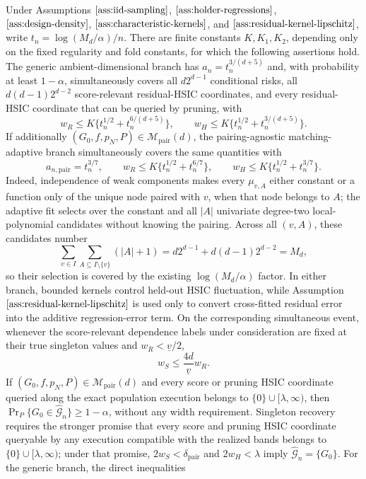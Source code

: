 Under Assumptions \(\ref{ass:iid-sampling}\), \(\ref{ass:holder-regressions}\), \(\ref{ass:design-density}\), \(\ref{ass:characteristic-kernels}\), and \(\ref{ass:residual-kernel-lipschitz}\), write \(t_n=\log(M_d/\alpha)/n\). There are finite constants \(K,K_1,K_2\), depending only on the fixed regularity and fold constants, for which the following assertions hold. The generic ambient-dimensional branch has \(a_n=t_n^{3/(d+5)}\) and, with probability at least \(1-\alpha\), simultaneously covers all \(d2^{d-1}\) conditional risks, all \(d(d-1)2^{d-2}\) score-relevant residual-HSIC coordinates, and every residual-HSIC coordinate that can be queried by pruning, with
\[
 w_R\le K\{t_n^{1/2}+t_n^{6/(d+5)}\},
 \qquad
 w_H\le K\{t_n^{1/2}+t_n^{3/(d+5)}\}.
\]
If additionally \((G_0,f,p_N,P)\in\mathcal M_{\mathrm{pair}}(d)\), the pairing-agnostic matching-adaptive branch simultaneously covers the same quantities with
\[
 a_{n,\mathrm{pair}}=t_n^{3/7},
 \qquad
 w_R\le K\{t_n^{1/2}+t_n^{6/7}\},
 \qquad
 w_H\le K\{t_n^{1/2}+t_n^{3/7}\}.
\]
Indeed, independence of weak components makes every \(\mu_{v,A}\) either constant or a function only of the unique node paired with \(v\), when that node belongs to \(A\); the adaptive fit selects over the constant and all \(|A|\) univariate degree-two local-polynomial candidates without knowing the pairing. Across all \((v,A)\), these candidates number
\[
 \sum_{v\in I}\sum_{A\subseteq I\setminus\{v\}}(|A|+1)
 =d2^{d-1}+d(d-1)2^{d-2}=M_d,
\]
so their selection is covered by the existing \(\log(M_d/\alpha)\) factor. In either branch, bounded kernels control held-out HSIC fluctuation, while Assumption \(\ref{ass:residual-kernel-lipschitz}\) is used only to convert cross-fitted residual error into the additive regression-error term. On the corresponding simultaneous event, whenever the score-relevant dependence labels under consideration are fixed at their true singleton values and \(w_R<\underline v/2\),
\[
 w_S\le \frac{4d}{\underline v}w_R.
\]
If \((G_0,f,p_N,P)\in\mathcal M_{\mathrm{pair}}(d)\) and every score or pruning HSIC coordinate queried along the exact population execution belongs to \(\{0\}\cup[\lambda,\infty)\), then \(\Pr_P\{G_0\in\widehat{\mathcal G}_n\}\ge1-\alpha\), without any width requirement. Singleton recovery requires the stronger promise that every score and pruning HSIC coordinate queryable by any execution compatible with the realized bands belongs to \(\{0\}\cup[\lambda,\infty)\); under that promise, \(2w_S<\delta_{\mathrm{pair}}\) and \(2w_H<\lambda\) imply \(\widehat{\mathcal G}_n=\{G_0\}\). For the generic branch, the direct inequalities
